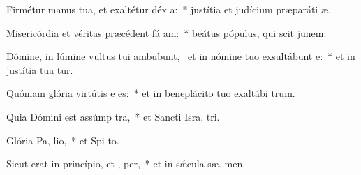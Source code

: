 \item Firmétur manus tua, et exaltétur déx a:~* justítia et judícium præparáti  æ.
\item Misericórdia et véritas præcédent fá am:~* beátus pópulus, qui scit junem.
\item Dómine, in lúmine vultus tui ambubunt,~\pscross{} et in nómine tuo exsultábunt  e:~* et in justítia tua tur.
\item Quóniam glória virtútis e  es:~* et in beneplácito tuo exaltábi  trum.
\item Quia Dómini est assúmp tra,~* et Sancti Isra,  tri.
\item Glória Pa,  lio,~* et Spi to.
\item Sicut erat in princípio, et ,  per,~* et in sǽcula sæ. men.
